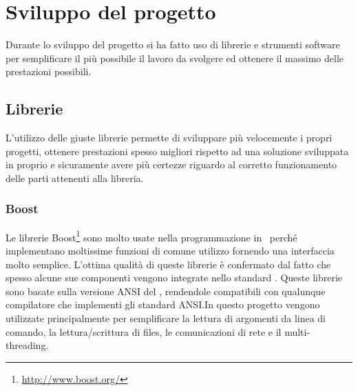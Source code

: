 \chapter{Sviluppo del progetto}
\label{sw_devel}

Durante lo sviluppo del progetto si ha fatto uso di librerie e strumenti
software per semplificare il pi\`u possibile il lavoro da svolgere ed ottenere
il massimo delle prestazioni possibili. 

\section{Librerie}
L'utilizzo delle giuste librerie permette di sviluppare pi\`u velocemente i
propri progetti, ottenere prestazioni spesso migliori rispetto ad una soluzione
sviluppata in proprio e sicuramente avere pi\`u certezze riguardo al corretto
funzionamento delle parti attenenti alla libreria.

\subsection{Boost}
Le librerie Boost\footnote{\url{http://www.boost.org/}} sono molto usate nella
programmazione in \CC\, perch\'e implementano moltissime funzioni di comune
utilizzo fornendo una interfaccia molto semplice. L'ottima qualit\`a di queste
librerie \`e confermato dal fatto che spesso alcune sue componenti vengono
integrate nello standard \CC. Queste librerie sono basate sulla versione ANSI
del \CC, rendendole compatibili con qualunque compilatore che implementi gli
standard ANSI.In questo progetto vengono utilizzate principalmente per
semplificare la lettura di argomenti da linea di comando, la lettura/scrittura
di files, le comunicazioni di rete e il multi-threading.

